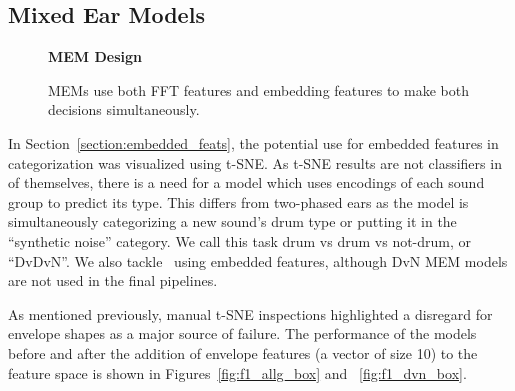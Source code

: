 \documentclass[\main/thesis.tex]{subfiles}
\begin{document}



\subsection{Mixed Ear Models}

\begin{figure}[t!]
    \begin{center}
    \textbf{MEM Design}
    \end{center}
    \caption{MEMs use both FFT features and embedding features to make both decisions simultaneously. }
\label{fig:TPE_design}
\end{figure}
\label{chap3:mixed_ear_models}
In Section~\ref{section:embedded_feats}, the potential use for embedded features in categorization was visualized using t-SNE. As t-SNE results are not classifiers in of themselves, there is a need for a model which uses encodings of each sound group to predict its type. This differs from two-phased ears as the model is simultaneously categorizing a new sound's drum type or putting it in the \enquote{synthetic noise} category. We call this task drum vs drum vs not-drum, or \enquote{DvDvN}. We also tackle \decfirst~using embedded features, although DvN MEM models are not used in the final pipelines.

As mentioned previously, manual t-SNE inspections highlighted a disregard for envelope shapes as a major source of failure. The performance of the models before and after the addition of envelope features (a vector of size 10) to the feature space is shown in Figures~\ref{fig:f1_allg_box} and ~\ref{fig:f1_dvn_box}. 
\end{document}
